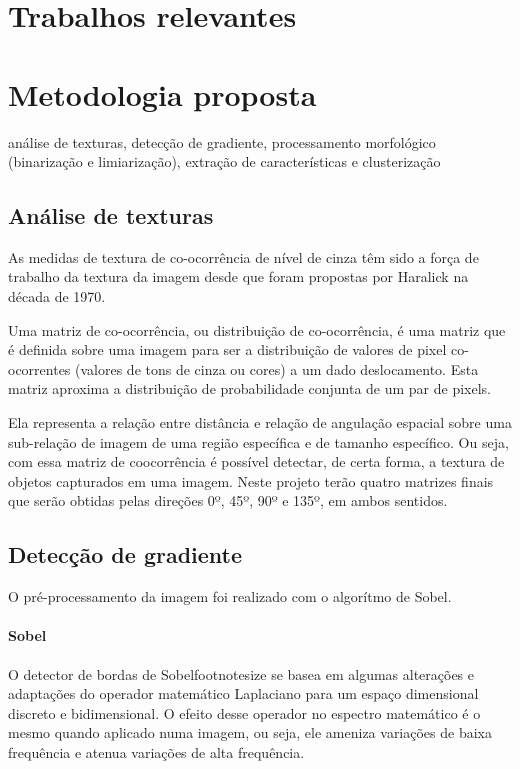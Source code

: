 \documentclass[10pt,twocolumn,letterpaper]{article}
\begin{document}
\section{Trabalhos relevantes}



\section{Metodologia proposta}
análise de texturas, detecção de gradiente,
processamento morfológico (binarização e limiarização), extração de características
e clusterização

\subsection{Análise de texturas}

	As medidas de textura de co-ocorrência de nível de cinza têm sido a força de trabalho
da textura da imagem desde que foram propostas por Haralick{\footnotesize \cite{haralick}}
na década de 1970.

	Uma matriz de co-ocorrência, ou distribuição de co-ocorrência,{\footnotesize \cite{GLCM-tutorial}}
é uma matriz que é definida sobre uma imagem para ser a distribuição de valores de pixel
co-ocorrentes (valores de tons de cinza ou cores) a um dado deslocamento. Esta matriz
aproxima a distribuição de probabilidade conjunta de um par de pixels.

	Ela representa a relação entre distância e relação de angulação espacial sobre uma
sub-relação de imagem de uma região específica e de tamanho específico. Ou seja, com
essa matriz de coocorrência é possível detectar, de certa forma, a textura de objetos
capturados em uma imagem. Neste projeto terão quatro matrizes finais que serão obtidas
pelas direções 0º, 45º, 90º e 135º, em ambos sentidos.


\subsection{Detecção de gradiente}
	
	O pré-processamento da imagem foi realizado com o algorítmo de Sobel.
\paragraph{Sobel}
	O detector de bordas de Sobel{footnotesize \cite{sobel1}} se basea em algumas
alterações e adaptações do operador matemático Laplaciano{\footnotesize \cite{laplace1}}
para um espaço dimensional discreto e bidimensional{\footnotesize \cite{laplace2}}. O
efeito desse operador no espectro matemático é o mesmo quando aplicado numa imagem,
ou seja, ele ameniza variações de baixa frequência e atenua variações de alta frequência.{\footnotesize \cite{sobel2}}
\end{document}
